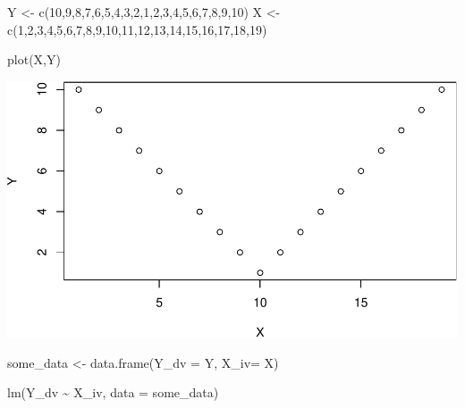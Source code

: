 \documentclass[
  english,
  man]{article}
\newenvironment{Shaded}{\begin{snugshade}}{\end{snugshade}}
\newcommand{\AttributeTok}[1]{\textcolor[rgb]{0.77,0.63,0.00}{#1}}
\newcommand{\DecValTok}[1]{\textcolor[rgb]{0.00,0.00,0.81}{#1}}
\newcommand{\FunctionTok}[1]{\textcolor[rgb]{0.00,0.00,0.00}{#1}}
\newcommand{\NormalTok}[1]{#1}
\newcommand{\OtherTok}[1]{\textcolor[rgb]{0.56,0.35,0.01}{#1}}
\newcommand{\SpecialCharTok}[1]{\textcolor[rgb]{0.00,0.00,0.00}{#1}}
\begin{document}
\begin{Shaded}
\begin{Highlighting}[]
\NormalTok{Y }\OtherTok{\textless{}{-}} \FunctionTok{c}\NormalTok{(}\DecValTok{10}\NormalTok{,}\DecValTok{9}\NormalTok{,}\DecValTok{8}\NormalTok{,}\DecValTok{7}\NormalTok{,}\DecValTok{6}\NormalTok{,}\DecValTok{5}\NormalTok{,}\DecValTok{4}\NormalTok{,}\DecValTok{3}\NormalTok{,}\DecValTok{2}\NormalTok{,}\DecValTok{1}\NormalTok{,}\DecValTok{2}\NormalTok{,}\DecValTok{3}\NormalTok{,}\DecValTok{4}\NormalTok{,}\DecValTok{5}\NormalTok{,}\DecValTok{6}\NormalTok{,}\DecValTok{7}\NormalTok{,}\DecValTok{8}\NormalTok{,}\DecValTok{9}\NormalTok{,}\DecValTok{10}\NormalTok{)}
\NormalTok{X }\OtherTok{\textless{}{-}} \FunctionTok{c}\NormalTok{(}\DecValTok{1}\NormalTok{,}\DecValTok{2}\NormalTok{,}\DecValTok{3}\NormalTok{,}\DecValTok{4}\NormalTok{,}\DecValTok{5}\NormalTok{,}\DecValTok{6}\NormalTok{,}\DecValTok{7}\NormalTok{,}\DecValTok{8}\NormalTok{,}\DecValTok{9}\NormalTok{,}\DecValTok{10}\NormalTok{,}\DecValTok{11}\NormalTok{,}\DecValTok{12}\NormalTok{,}\DecValTok{13}\NormalTok{,}\DecValTok{14}\NormalTok{,}\DecValTok{15}\NormalTok{,}\DecValTok{16}\NormalTok{,}\DecValTok{17}\NormalTok{,}\DecValTok{18}\NormalTok{,}\DecValTok{19}\NormalTok{)}

\FunctionTok{plot}\NormalTok{(X,Y)}
\end{Highlighting}
\end{Shaded}

\includegraphics{CopyOflab12_files/figure-latex/unnamed-chunk-1-1.pdf}

\begin{Shaded}
\begin{Highlighting}[]
\NormalTok{some\_data }\OtherTok{\textless{}{-}} \FunctionTok{data.frame}\NormalTok{(}\AttributeTok{Y\_dv =}\NormalTok{ Y, }\AttributeTok{X\_iv=}\NormalTok{ X)}

\FunctionTok{lm}\NormalTok{(Y\_dv }\SpecialCharTok{\textasciitilde{}}\NormalTok{ X\_iv, }\AttributeTok{data =}\NormalTok{ some\_data)}
\end{Highlighting}
\end{Shaded}
\end{document}
